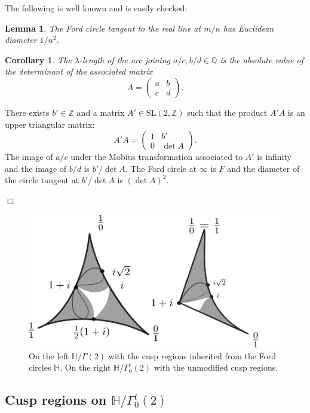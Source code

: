 \documentclass[12pt,a4paper]{amsart}
\newtheorem{coro}[thm]{Corollary}
\newtheorem{lem}[thm]{Lemma}
\def\HH{\mathbb{H}}
\def\g2{\Gamma(2)}
\def\ah{\Gamma_0^t(2)}
\def\oot{\HH / \ah}
\def\xx{\HH/\g2}
\def\ZZ{\mathbb{Z}}
\def\sl2{\mathrm{SL}(2, \ZZ)}
\begin{document}
The following is well known and is easily checked:

\begin{lem}\label{ford}
The Ford circle tangent to the real line at $m/n$
has Euclidean diameter $1/n^2$.
\end{lem}

\begin{coro}
	The $\lambda$-length of the arc joining 
	$a/c, b/d \in \mathbb{Q}$ is the absolute value of
	the determinant of the associated matrix 
	$$A= \begin{pmatrix} a& b\\c&d \end{pmatrix}.$$
\end{coro}

\proof There exists  $b'\in \mathbb{Z}$ and  a matrix $A' \in \sl2$ such that the product $A'A$
is an upper triangular matrix:
	$$A'A= \begin{pmatrix} 1& b'\\0& \det A
	\end{pmatrix}.$$
The image of $a/c$ under the Mobius transformation associated to
$A'$ is infinity and the image of $b/d$ is $b'/\det A$.
The Ford circle at $\infty$ is $F$ and the 
diameter of the circle tangent at $b'/\det A$ is $(\det A)^2$.

\hfill $\Box$

  \begin{figure}[H]
	  \label{cusp regions}
\begin{center}
\includegraphics[scale=.5]{hecke_cover.png} 
\end{center}
\caption{On the left $\xx$ with the cusp regions inherited from the
Ford circles  $\mathbb{H}$.
On the right $\oot$ with the unmodified cusp regions.}
\end{figure}
\subsection{Cusp regions  on $\oot$}
\end{document}
